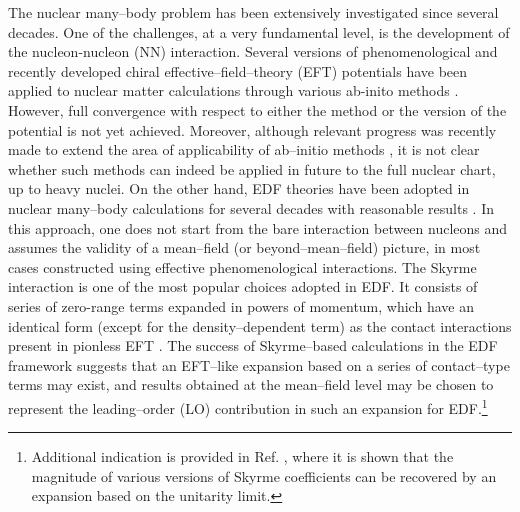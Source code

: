 \documentclass[aps,11pt,prc,preprint,superscriptaddress,nofootinbib]{revtex4}
\begin{document}
\bigskip The nuclear many--body problem has been extensively investigated since 
several decades. One of the challenges, at a very fundamental level, is the 
development of the
nucleon-nucleon (NN) interaction. Several versions of phenomenological and recently 
developed chiral effective--field--theory (EFT) potentials have been applied
to nuclear matter calculations through various ab-inito methods \cite%
{qmc1,qmc2,qmc3,db-nm,qmc5,lattice-eft,resum-k,qmcp1,qmcp2,qmcp3,qmcp4,qmcp5,qmce1,qmce2,qmce3,qmce4,qmce5,qmce6,qmce7,qmce8,qmce9,rev}%
. However, full convergence with respect to either the
method or the version of the potential is not yet achieved. Moreover, although 
relevant progress was recently made to extend the area of applicability of ab--initio methods 
\cite{Bog14,Her14,Sig15,Geb16,Jan16,Str16,Str17,Tic17}, it is not clear 
whether such methods can indeed be applied in future to the full 
nuclear chart, up to heavy nuclei. On the other hand, 
EDF theories have been adopted in nuclear many--body calculations for several 
decades with reasonable results \cite{bender}. In this approach, one does not start
from the bare interaction between nucleons and assumes the validity of a 
mean--field (or beyond--mean--field) picture, in most cases constructed using  
effective phenomenological 
interactions.
The Skyrme interaction \cite{skyrme,vauth} is 
one of the most popular choices adopted in EDF. It consists of series of
zero-range terms expanded in powers of momentum, which have an identical
form (except for the density--dependent term) as the contact interactions present in pionless EFT \cite{pionless,pastore}. 
The success of Skyrme--based 
calculations in the EDF
framework suggests that an EFT--like expansion based on a series of contact--type
terms may exist, and results obtained at the 
mean--field level may be chosen to represent
the leading--order (LO) contribution in such an expansion for EDF.\footnote{Additional indication is provided in Ref. \cite{denis17}, where it is shown that the magnitude of various versions of Skyrme coefficients can be recovered by an expansion based on the unitarity limit.} 
\end{document}
